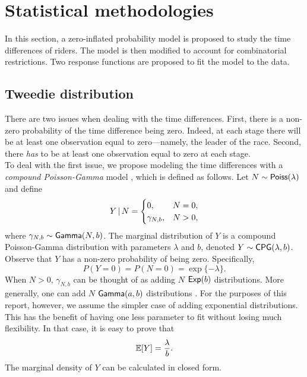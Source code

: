 \documentclass[aos,preprint]{imsart}
\begin{document}


\section{Statistical methodologies} \label{sec:stats}

In this section, a zero-inflated probability model is proposed to study the time differences of riders. The model is then modified to account for combinatorial restrictions. Two response functions are proposed to fit the model to the data.



\subsection{Tweedie distribution}

There are two issues when dealing with the time differences. First, there is a non-zero probability of the time difference being zero. Indeed, at each stage there will be at least one observation equal to zero---namely, the leader of the race. Second, there \textit{has} to be at least one observation equal to zero at each stage. \\


To deal with the first issue, we propose modeling the time differences with a \textit{compound Poisson-Gamma} model \citep{tweedie1984, jorgensen1987}, which is defined as follows. Let $N \sim {\sf{Poiss}}(\lambda)$ and define
\[
  Y \given N = \begin{cases}
    0, & N = 0, \\
    \gamma_{N, b}, & N > 0,
  \end{cases}
\]
where $\gamma_{N, b} \sim {\sf{Gamma}}(N, b)$. The marginal distribution of $Y$ is a compound Poisson-Gamma distribution with parameters $\lambda$ and $b$, denoted $Y \sim {\sf{CPG}}(\lambda, b)$. Observe that $Y$ has a non-zero probability of being zero. Specifically,
\[
  P(Y = 0) = P(N = 0) = \exp \{ -\lambda \}.
\]
When $N > 0$, $\gamma_{N, b}$ can be thought of as adding $N$ \iid ${\sf{Exp}}(b)$ distributions. More generally, one can add $N$ \iid ${\sf{Gamma}}(a, b)$ distributions \citep[see][]{withers2011}. For the purposes of this report, however, we assume the simpler case of adding exponential distributions. This has the benefit of having one less parameter to fit without losing much flexibility. In that case, it is easy to prove that
\[
  \mathbb{E} [Y] = \frac{\lambda}{b}.
\]
The marginal density of $Y$ can be calculated in closed form.
\end{document}
